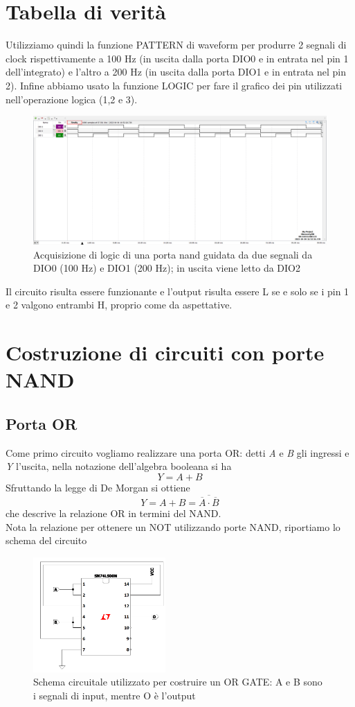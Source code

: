 \documentclass[10pt, a4paper, italian]{article}
\begin{document}
\section{Tabella di verità}
Utilizziamo quindi la funzione PATTERN di waveform per produrre 2 segnali di clock rispettivamente a 100 Hz (in uscita dalla porta DIO0 e in entrata nel pin 1 dell'integrato) e l'altro a 200 Hz (in uscita dalla porta DIO1 e in entrata nel pin 2). Infine abbiamo usato la funzione LOGIC per fare il grafico dei pin utilizzati nell'operazione logica (1,2 e 3). 
\begin{figure}
	\includegraphics[scale=0.4]{nand_time}
	\caption{Acquisizione di logic di una porta nand guidata da due segnali da DIO0 (100 Hz) e DIO1 (200 Hz); in uscita viene letto da DIO2}
	\label{nand_time}
\end{figure}
Il circuito risulta essere funzionante e l'output risulta essere L se e solo se i pin 1 e 2 valgono entrambi H, proprio come da aspettative.

\section{Costruzione di circuiti con porte NAND}
\subsection{Porta OR}
Come primo circuito vogliamo realizzare una porta OR: detti \textit{A} e \textit{B} gli ingressi e \textit{Y} l'uscita, nella notazione dell'algebra booleana si ha
\[
    Y = A + B
\]
Sfruttando la legge di De Morgan si ottiene
\[
    Y = A + B = \overline{\overline{A}\cdot\overline{B}}
\]
che descrive la relazione OR in termini del NAND.\\
Nota la relazione per ottenere un NOT utilizzando porte NAND, riportiamo lo schema del circuito
\begin{figure}[htbp]
    \centering
    \includegraphics[width=0.45\textwidth]{NAND_OR}
    \caption{\label{fig: OR} Schema circuitale utilizzato per costruire un OR GATE: A e B sono i segnali di input, mentre O è l'output}
\end{figure}
\end{document}

